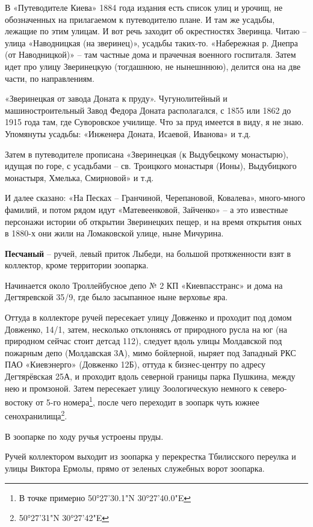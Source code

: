 В «Путеводителе Киева» 1884 года издания есть список улиц и урочищ, не обозначенных на прилагаемом к путеводителю плане. И там же усадьбы, лежащие по этим улицам. И вот речь заходит об окрестностях Зверинца. Читаю – улица «Наводницкая (на зверинец)», усадьбы таких-то. «Набережная р. Днепра (от Наводницкой)» – там частные дома и прачечная военного госпиталя. Затем идет про улицу Зверинецкую (тогдашнюю, не нынешннюю), делится она на две части, по направлениям.

«Зверинецкая от завода Доната к пруду». Чугунолитейный и машиностроительный Завод Федора Доната располагался, с 1855 или 1862 до 1915 года там, где Суворовское училище. Что за пруд имеется в виду, я не знаю. Упомянуты усадьбы: «Инженера Доната, Исаевой, Иванова» и т.д.

Затем в путеводителе прописана «Зверинецкая (к Выдубецкому монастырю), идущая по горе, с усадьбами – св. Троицкого монастыря (Ионы), Выдубицкого монастыря, Хмелька, Смирновой» и т.д.

И далее сказано: «На Песках – Гранчиной, Черепановой, Ковалева», много-много фамилий, и потом рядом идут «Матевеенковой, Зайченко» – а это известные персонажи истории об открытии Зверинецких пещер, и на время открытия оных в 1880-х они жили на Ломаковской улице, ныне Мичурина.\\

\medskip

\textbf{Песчаный} – ручей, левый приток Лыбеди, на большой протяженности взят в коллектор, кроме территории зоопарка.

Начинается около Троллейбусное депо № 2 КП «Киевпасстранс» и дома на Дегтяревской 35/9, где было засыпанное ныне верховье яра. 

Оттуда в коллекторе ручей пересекает улицу Довженко и проходит под домом Довженко, 14/1, затем, несколько отклоняясь от природного русла на юг (на природном сейчас стоит детсад 112), следует вдоль улицы Молдавской под пожарным депо (Молдавская 3А), мимо  бойлерной, ныряет под Западный РКС ПАО «Киевэнерго» (Довженко 12Б), оттуда к бизнес-центру по адресу Дегтярёвская 25А, и проходит вдоль северной границы парка Пушкина, между нею и промзоной. Затем пересекает улицу Зоологическую немного к северо-востоку от 5-го номера\footnote{В точке примерно 50°27'30.1"N 30°27'40.0"E}, после чего переходит в зоопарк чуть южнее сенохранилища\footnote{50°27'31"N 30°27'42"E}.

В зоопарке по ходу ручья устроены пруды.

Ручей коллектором выходит из зоопарка у перекрестка Тбилисского переулка и улицы Виктора Ермолы, прямо от зеленых служебных ворот зоопарка.

